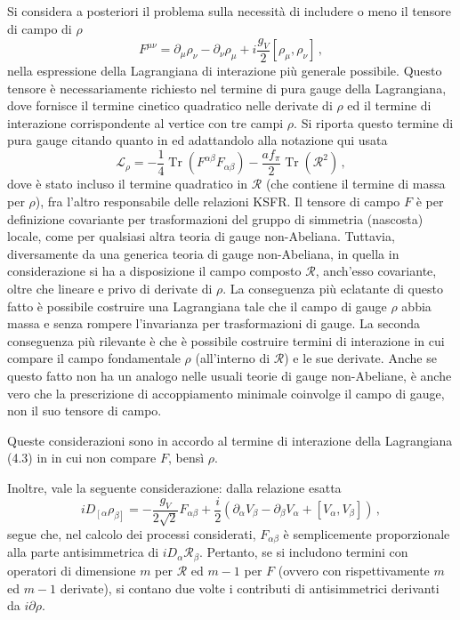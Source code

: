 \documentclass{article}
\DeclareMathOperator{\tr}{Tr}
\begin{document}
Si considera a posteriori il problema sulla necessità di includere o meno il tensore di campo di $\rho$
\begin{equation}
  F^{\mu \nu} = \partial_\mu \rho_\nu - \partial_\nu \rho_\mu + i \frac{g_V}{2} \left[ \rho_\mu , \rho_\nu \right] \, ,
\end{equation}
nella espressione della Lagrangiana di interazione più generale possibile. Questo tensore è necessariamente richiesto nel termine di pura gauge della Lagrangiana, dove fornisce il termine cinetico quadratico nelle derivate di $\rho$ ed il termine di interazione corrispondente al vertice con tre campi $\rho$. Si riporta questo termine di pura gauge citando quanto in \cite{article:Casalbuoni} ed adattandolo alla notazione qui usata
\begin{equation}
  \mathcal{L}_\rho = - \frac{1}{4} \tr \left( F^{\alpha \beta} F_{\alpha \beta} \right) - \frac{a f_\pi }{2} \tr \left( \mathcal{R}^2 \right) \, ,
\end{equation}
dove è stato incluso il termine quadratico in $\mathcal{R}$ (che contiene il termine di massa per $\rho$), fra l'altro responsabile delle relazioni KSFR.
Il tensore di campo $F$ è per definizione covariante per trasformazioni del gruppo di simmetria (nascosta) locale, come per qualsiasi altra teoria di gauge non-Abeliana. Tuttavia, diversamente da una generica teoria di gauge non-Abeliana, in quella in considerazione si ha a disposizione il campo composto $\mathcal{R}$, anch'esso covariante, oltre che lineare e privo di derivate di $\rho$. La conseguenza più eclatante di questo fatto è possibile costruire una Lagrangiana tale che il campo di gauge $\rho$ abbia massa e senza rompere l'invarianza per trasformazioni di gauge. La seconda conseguenza più rilevante è che è possibile costruire termini di interazione in cui compare il campo fondamentale $\rho$ (all'interno di $\mathcal{R}$) e le sue derivate. Anche se questo fatto non ha un analogo nelle usuali teorie di gauge non-Abeliane, è anche vero che la prescrizione di accoppiamento minimale coinvolge il campo di gauge, non il suo tensore di campo.

Queste considerazioni sono in accordo al termine di interazione della Lagrangiana (4.3) in \cite{article:Casalbuoni} in cui non compare $F$, bensì $\rho$.

Inoltre, vale la seguente considerazione: dalla relazione esatta
\begin{equation}
  i D_{\left[ \alpha \right.} \rho_{\left. \beta \right]} = - \frac{g_V}{2 \sqrt{2}} F_{\alpha \beta} + \frac{i}{2} \left( \partial_\alpha V_\beta - \partial_\beta V_\alpha +  \left[ V_\alpha , V_\beta \right] \right) \, ,
\end{equation} 
segue che, nel calcolo dei processi considerati, $F_{\alpha \beta}$ è semplicemente proporzionale alla parte antisimmetrica di $i D_\alpha \mathcal{R}_\beta$. Pertanto, se si includono termini con operatori di dimensione $m$ per $\mathcal{R}$ ed $m-1$ per $F$ (ovvero con rispettivamente $m$ ed $m-1$ derivate), si contano due volte i contributi di antisimmetrici derivanti da $i \partial \rho$.
\end{document}
